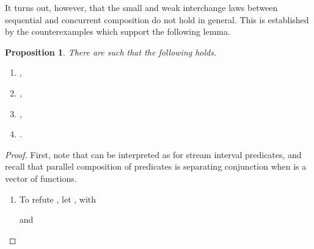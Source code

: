 \documentclass[12pt]{article}
\newtheorem{proposition}{Proposition}
\theoremstyle{definition}
\begin{document}
It turns out, however, that the small and weak interchange laws
between sequential and concurrent composition do not hold in
general. This is established by the counterexamples which support the
following lemma.
\begin{proposition}
  There are  such that the following
  holds.
  \begin{enumerate}\label{prop:interchangeref}
  \item ,
  \item ,
  \item ,
  \item .
  \end{enumerate}
\end{proposition}
\begin{proof}
  First, note that  can be interpreted as  for
  stream interval predicates, and recall that parallel composition of
  predicates is separating conjunction when  is a vector of
  functions. 
\begin{enumerate}
\item To refute , let , 
  with
  
  and
   

\end{enumerate}
\end{proof}
\end{document}
